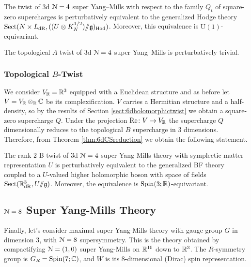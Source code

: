 \documentclass[10pt, oneside]{article}
\renewcommand{\Re}{\mathrm{Re}}
\renewcommand{\U}{\mathrm{U}}
\newcommand{\ham}{/\!\!/}
\begin{document}
\begin{theorem}
The twist of 3d $\mathcal N=4$ super Yang--Mills with respect to the family $Q_t$ of square-zero supercharges is perturbatively equivalent to the generalized Hodge theory $\mr{Sect}(N \times L_{\mr{dR}}, ((U \otimes K^{1/2}_N)\ham \gg)_{\mr{Hod}})$. Moreover, this equivalence is $\U(1)$-equivariant.
\label{3d_4_A_twist_thm}
\end{theorem}

\begin{corollary}
The topological $A$ twist of 3d $\mathcal N=4$ super Yang--Mills is perturbatively trivial.
\end{corollary}

\subsubsection{Topological $B$-Twist}
\label{sect:3d_4_B_twist}
We consider $V_\mathbb R=\mathbb R^3$ equipped with a Euclidean structure and as before let $V=V_\mathbb R\otimes_\mathbb R\mathbb C$ be its complexification. $V$ carries a Hermitian structure and a half-density, so by the results of Section \ref{sect:6dholomorphictwist} we obtain a square-zero supercharge $Q$. Under the projection $\Re\colon V\rightarrow V_\RR$ the supercharge $Q$ dimensionally reduces to the topological $B$ supercharge in 3 dimensions. Therefore, from Theorem \ref{thm:6dCSreduction} we obtain the following statement.

\begin{theorem} \label{3d_4_B_twist_thm}
The rank $2$ B-twist of 3d $\mathcal{N}=4$ super Yang-Mills theory with symplectic matter representation $U$ is perturbatively equivalent to the generalized BF theory coupled to a $U$-valued higher holomorphic boson with space of fields $\mr{Sect}(\RR^3_{\mr{dR}}, U\ham \gg)$. Moreover, the equivalence is $\mathrm{Spin}(3; \mathbb R)$-equivariant. 
\end{theorem}

\subsection{\texorpdfstring{$\mathcal N = 8$}{N=8} Super Yang-Mills Theory} \label{3d8section}
Finally, let's consider maximal super Yang-Mills theory with gauge group $G$ in dimension 3, with $\mathcal{N}=8$ supersymmetry.  This is the theory obtained by compactifying $\mathcal{N}=(1,0)$ super Yang-Mills on $\mathbb R^{10}$ down to $\mathbb R^3$.  
The $R$-symmetry group is $G_R = \mathrm{Spin}(7;\mathbb C)$, and $W$ is its $8$-dimensional (Dirac) spin representation.
\end{document}
